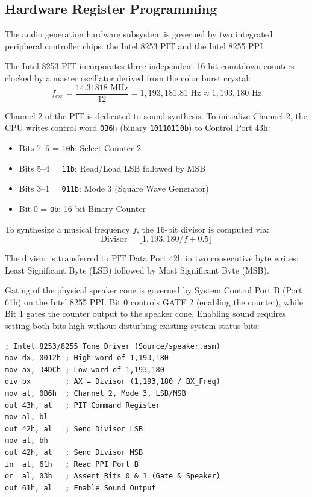 \documentclass[conference]{IEEEtran}
\begin{document}
\subsection{Hardware Register Programming}
The audio generation hardware subsystem is governed by two integrated peripheral controller chips: the Intel 8253 PIT and the Intel 8255 PPI.

The Intel 8253 PIT incorporates three independent 16-bit countdown counters clocked by a master oscillator derived from the color burst crystal:
\begin{equation}
f_{\text{osc}} = \frac{14.31818\text{ MHz}}{12} = 1,193,181.81\text{ Hz} \approx 1,193,180\text{ Hz}
\end{equation}

Channel 2 of the PIT is dedicated to sound synthesis. To initialize Channel 2, the CPU writes control word \texttt{0B6h} (binary \texttt{10110110b}) to Control Port 43h:
\begin{itemize}
\item Bits 7--6 = \texttt{10b}: Select Counter 2
\item Bits 5--4 = \texttt{11b}: Read/Load LSB followed by MSB
\item Bits 3--1 = \texttt{011b}: Mode 3 (Square Wave Generator)
\item Bit 0 = \texttt{0b}: 16-bit Binary Counter
\end{itemize}

To synthesize a musical frequency $f$, the 16-bit divisor is computed via:
\begin{equation}
\text{Divisor} = \lfloor 1,193,180 / f + 0.5 \rfloor
\end{equation}

The divisor is transferred to PIT Data Port 42h in two consecutive byte writes: Least Significant Byte (LSB) followed by Most Significant Byte (MSB).

Gating of the physical speaker cone is governed by System Control Port B (Port 61h) on the Intel 8255 PPI. Bit 0 controls GATE 2 (enabling the counter), while Bit 1 gates the counter output to the speaker cone. Enabling sound requires setting both bits high without disturbing existing system status bits:

\begin{lstlisting}[language={[x86masm]Assembler}]
; Intel 8253/8255 Tone Driver (Source/speaker.asm)
mov dx, 0012h ; High word of 1,193,180
mov ax, 34DCh ; Low word of 1,193,180
div bx        ; AX = Divisor (1,193,180 / BX_Freq)
mov al, 0B6h  ; Channel 2, Mode 3, LSB/MSB
out 43h, al   ; PIT Command Register
mov al, bl
out 42h, al   ; Send Divisor LSB
mov al, bh
out 42h, al   ; Send Divisor MSB
in  al, 61h   ; Read PPI Port B
or  al, 03h   ; Assert Bits 0 & 1 (Gate & Speaker)
out 61h, al   ; Enable Sound Output
\end{lstlisting}
\end{document}
